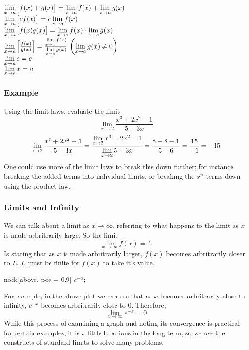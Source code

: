 \documentclass[12pt]{report}
\begin{document}
\begin{flushleft}
\begin{formulalist}
    \(\lim\limits_{x\rightarrow a}\left[f(x) + g(x)\right]
    = \lim\limits_{x\rightarrow a} f(x) 
    + \lim\limits_{x\rightarrow a} g(x)\) \\ 
    \(\lim\limits_{x \rightarrow a}\left[cf(x)\right] 
    = c\lim\limits_{x \rightarrow a}f(x)\) \\ 
    \(\lim\limits_{x \rightarrow a}\left[f(x)g(x)\right] 
    = \lim\limits_{x \rightarrow a}f(x) \cdot
    \lim\limits_{x \rightarrow a}g(x)\) \\ 
    \(\lim\limits_{x \rightarrow a}\left[\frac{f(x)}{g(x)}\right] 
    = \frac{\lim\limits_{x \rightarrow a}f(x)}{
    \lim\limits_{x \rightarrow a}g(x)} 
    \:\left(\lim\limits_{x \rightarrow a}g(x) \neq 0\right)\) \\ 
    \(\lim\limits_{x \rightarrow a} c = c\) \\ 
    \(\lim\limits_{x \rightarrow a} x = a\) \\ 
\end{formulalist}

\subsubsection*{Example}
Using the limit laws, evaluate the limit
\[\lim_{x\rightarrow2}\frac{x^3 + 2x^2 - 1}{5 - 3x}\]
\[\lim_{x\rightarrow2}\frac{x^3 + 2x^2 - 1}{5 - 3x} 
= \frac{\lim\limits_{x\rightarrow2} x^3 + 2x^2 - 1}{
\lim\limits_{x\rightarrow2} 5 - 3x} = \frac{8 + 8 - 1}{5 - 6} 
= \frac{15}{-1} = -15\]
One could use more of the limit laws to break this down further; for instance
breaking the added terms into individual limits, or breaking the \(x^n\) terms
down using the product law.

\subsubsection*{Limits and Infinity}
We can talk about a limit as \(x\rightarrow\infty\), referring to what happens
to the limit as \(x\) is made arbritrarily large. So the limit
\[\lim_{x\rightarrow\infty} f(x) = L\]
Is stating that as \(x\) is made arbritrarily larger, \(f(x)\) becomes 
arbritrarily closer to \(L\). \(L\) must be finite for \(f(x)\) to take it's
value.

\begin{plot}
    node[above, pos = 0.9] {\(e^{-x}\)};
\end{plot}

For example, in the above plot we can see that as \(x\) becomes arbritrarily 
close to infinity, \(e^{-x}\) becomes arbritrarily close to \(0\). Therefore,
\[\lim_{x\rightarrow\infty} e^{-x} = 0\]
While this process of examining a graph and noting its convergence is practical
for certain examples, it is a little laborious in the long term, so we use the 
constructs of standard limits to solve many problems.


\end{flushleft}
\end{document}
